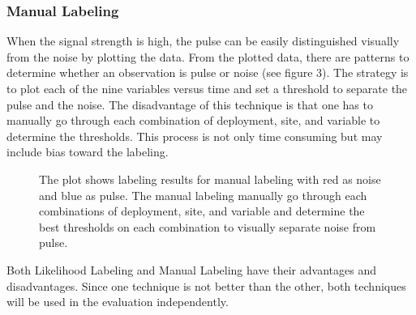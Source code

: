 \documentclass[twoside]{article}
\begin{document}
\subsubsection{Manual Labeling}
When the signal strength is high, the pulse can be easily distinguished visually from the noise by plotting the data. From the plotted data, there are patterns to determine whether an observation is pulse or noise (see figure 3). The strategy is to plot each of the nine variables versus time and set a threshold to separate the pulse and the noise. The disadvantage of this technique is that one has to manually go through each combination of deployment, site, and variable to determine the thresholds. This process is not only time consuming but may include bias toward the labeling. 

\begin{figure}[ht!]
     \begin{center}
%
    \end{center}
    \caption{%
        The plot shows labeling results for manual labeling with red as noise and blue as pulse. The manual labeling manually go through each combinations of deployment, site, and variable and determine the best thresholds on each combination to visually separate noise from pulse. 
     }%
   \label{fig:subfigures}
\end{figure}

\hfill \break
\noindent
Both Likelihood Labeling and Manual Labeling have their advantages and disadvantages. Since one technique is not better than the other, both techniques will be used in the evaluation independently.
\end{document}
